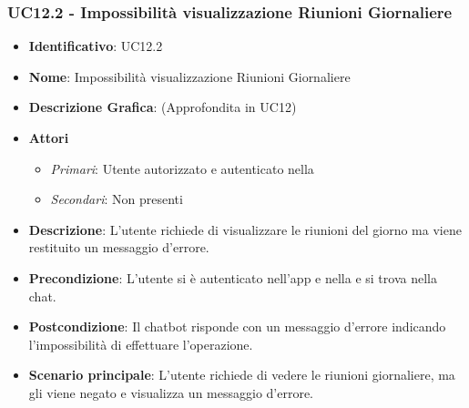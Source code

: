 \subsubsection{UC12.2 - Impossibilità visualizzazione Riunioni Giornaliere }
\begin{itemize}
	\item \textbf{Identificativo}: UC12.2
	\item \textbf{Nome}: Impossibilità visualizzazione Riunioni Giornaliere
	\item\textbf{Descrizione Grafica}: (Approfondita in UC12)
	\item \textbf{Attori}
	\begin{itemize} 
		\item \textit{Primari}: Utente autorizzato e autenticato nella 
		\item \textit{Secondari}: Non presenti
	\end{itemize}
	\item \textbf{Descrizione}: L'utente richiede di visualizzare le riunioni del giorno ma viene restituito un messaggio d'errore.
	\item \textbf{Precondizione}: L'utente si è autenticato nell'app e nella  e si trova nella chat.
	\item \textbf{Postcondizione}: Il chatbot risponde con un messaggio d'errore indicando l'impossibilità di effettuare l'operazione.
	\item \textbf{Scenario principale}: L'utente richiede di vedere le riunioni giornaliere, ma gli viene negato e visualizza un messaggio d'errore.
\end{itemize}
\newpage